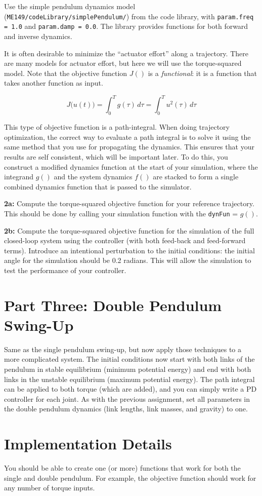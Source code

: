 \par
Use the simple pendulum dynamics model
(\texttt{ME149/codeLibrary/simplePendulum/}) from the code library,
with \texttt{param.freq = 1.0} and \texttt{param.damp = 0.0}.
The library provides functions for both forward and inverse dynamics.

\par
It is often desirable to minimize the ``actuator effort'' along a trajectory.
There are many models for actuator effort, but here we will use the torque-squared model.
Note that the objective function $J()$ is a
\textit{functional}: it is a function that takes another function as input.

\begin{equation}
J\big(u(t)\big) = \int_0^T \! g(\tau) \, d\tau = \int_0^T \! u^2(\tau) \, d\tau
\end{equation}

This type of objective function is a path-integral.
When doing trajectory optimization, the correct way to evaluate a path integral is to
solve it using the same method that you use for propagating the dynamics.
This ensures that your results are self consistent, which will be important later.
To do this, you construct a modified dynamics function at the start of your simulation,
where the integrand $g()$ and the system dynamics $f()$ are stacked to form a single
combined dynamics function that is passed to the simulator.

\par
\textbf{2a:} Compute the torque-squared objective function for your reference trajectory.
This should be done by calling your simulation function with the \texttt{dynFun} = $g()$.

\textbf{2b:} Compute the torque-squared objective function for the simulation of the
full closed-loop system using the controller (with both feed-back and feed-forward terms).
Introduce an intentional perturbation to the initial conditions:
the initial angle for the simulation should be 0.2 radians.
This will allow the simulation to test the performance of your controller.


\section*{Part Three: Double Pendulum Swing-Up}

Same as the single pendulum swing-up, but now apply those techniques to a
more complicated system. The initial conditions now start with both links of the
pendulum in stable equilibrium (minimum potential energy) and end with both links
in the unstable equilibrium (maximum potential energy). The path integral can be
applied to both torque (which are added), and you can simply write a PD controller
for each joint. As with the previous assignment, set all parameters in the double
pendulum dynamics (link lengths, link masses, and gravity) to one.

\section*{Implementation Details}

You should be able to create one (or more) functions that work for both the single and double pendulum.
For example, the objective function should work for any number of torque inputs.



